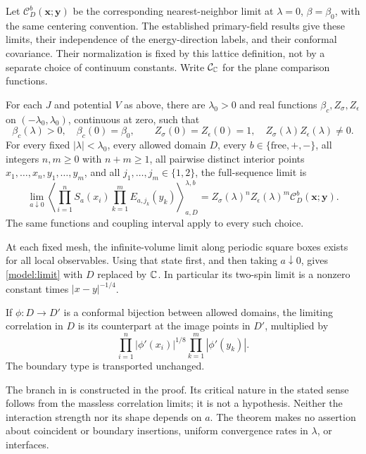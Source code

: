 Let $\mathcal C_D^b(\boldsymbol x;\boldsymbol y)$ be the corresponding
nearest-neighbor limit at $\lambda=0$, $\beta=\beta_0$, with the same
centering convention. The established primary-field results give these
limits, their independence of the energy-direction labels, and their
conformal covariance. Their normalization is fixed by this lattice
definition, not by a separate choice of continuum constants. Write
$\mathcal C_{\mathbb C}$ for the plane comparison functions.

\begin{theorem}\label{model:main}
For each $J$ and potential $V$ as above, there are $\lambda_0>0$ and real
functions $\beta_c,Z_\sigma,Z_\epsilon$ on $(-\lambda_0,\lambda_0)$,
continuous at zero, such that
\[
 \beta_c(\lambda)>0,\quad \beta_c(0)=\beta_0,\qquad
 Z_\sigma(0)=Z_\epsilon(0)=1,\quad
 Z_\sigma(\lambda)Z_\epsilon(\lambda)\ne0.
\]
For every fixed $|\lambda|<\lambda_0$, every allowed domain $D$, every
$b\in\{\mathrm{free},+,-\}$, all integers $n,m\ge0$ with $n+m\ge1$,
all pairwise distinct interior points $x_1,\ldots,x_n,y_1,\ldots,y_m$,
and all $j_1,\ldots,j_m\in\{1,2\}$, the full-sequence limit is
\begin{equation}\label{model:limit}
 \lim_{a\downarrow0}
 \left\langle\prod_{i=1}^n S_a(x_i)
                    \prod_{k=1}^m E_{a,j_k}(y_k)\right\rangle_{a,D}^{\lambda,b}
 =Z_\sigma(\lambda)^nZ_\epsilon(\lambda)^m
       \mathcal C_D^b(\boldsymbol x;\boldsymbol y).
\end{equation}
The same functions and coupling interval apply to every such choice.

At each fixed mesh, the infinite-volume limit along periodic square boxes
exists for all local observables. Using that state first, and then taking
$a\downarrow0$, gives \eqref{model:limit} with $D$ replaced by $\mathbb C$.
In particular its two-spin limit is a nonzero constant times
$|x-y|^{-1/4}$.

If $\phi:D\to D'$ is a conformal bijection between allowed domains, the
limiting correlation in $D$ is its counterpart at the image points in
$D'$, multiplied by
\begin{equation}\label{model:covariance}
 \prod_{i=1}^n|\phi'(x_i)|^{1/8}
 \prod_{k=1}^m|\phi'(y_k)|.
\end{equation}
The boundary type is transported unchanged.
\end{theorem}

The branch in  is constructed in the proof. Its critical
nature in the stated sense follows from the massless correlation limits;
it is not a hypothesis. Neither the interaction strength nor its shape
depends on $a$. The theorem makes no assertion about coincident or boundary
insertions, uniform convergence rates in $\lambda$, or interfaces.


